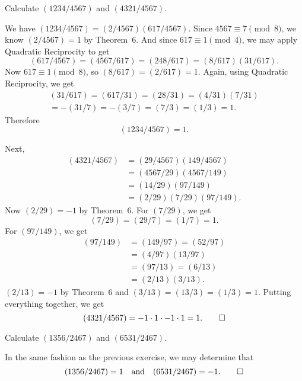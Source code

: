  Calculate $(1234/4567)$ and $(4321/4567)$.
\begin{solution}
  We have $(1234/4567) = (2/4567)(617/4567)$. Since
  $4567\equiv7\pmod8$, we know $(2/4567) = 1$ by Theorem~6. And since
  $617\equiv1\pmod4$, we may apply Quadratic Reciprocity to get
  \begin{equation*}
    (617/4567) = (4567/617) = (248/617) = (8/617)(31/617).
  \end{equation*}
  Now $617\equiv1\pmod8$, so $(8/617) = (2/617) = 1$. Again, using
  Quadratic Reciprocity, we get
  \begin{multline*}
    (31/617) = (617/31) = (28/31) = (4/31)(7/31) \\
    = -(31/7) = -(3/7) = (7/3) = (1/3) = 1.
  \end{multline*}
  Therefore
  \begin{equation*}
    (1234/4567) = 1.
  \end{equation*}

  Next,
  \begin{align*}
    (4321/4567) &= (29/4567)(149/4567) \\
                &= (4567/29)(4567/149) \\
                &= (14/29)(97/149) \\
                &= (2/29)(7/29)(97/149).
  \end{align*}
  Now $(2/29) = -1$ by Theorem~6. For $(7/29)$, we get
  \begin{equation*}
    (7/29) = (29/7) = (1/7) = 1.
  \end{equation*}
  For $(97/149)$, we get
  \begin{align*}
    (97/149) &= (149/97) = (52/97) \\
             &= (4/97)(13/97) \\
             &= (97/13) = (6/13) \\
             &= (2/13)(3/13).
  \end{align*}
  $(2/13) = -1$ by Theorem~6 and $(3/13) = (13/3) = (1/3) =
  1$. Putting everything together, we get
  \begin{equation*}
    (4321/4567) = -1\cdot1\cdot-1\cdot1 = 1. \qedhere
  \end{equation*}
\end{solution}

 Calculate $(1356/2467)$ and $(6531/2467)$.
\begin{solution}
  In the same fashion as the previous exercise, we may determine that
  \begin{equation*}
    (1356/2467) = 1
    \quad\text{and}\quad
    (6531/2467) = -1. \qedhere
  \end{equation*}
\end{solution}

